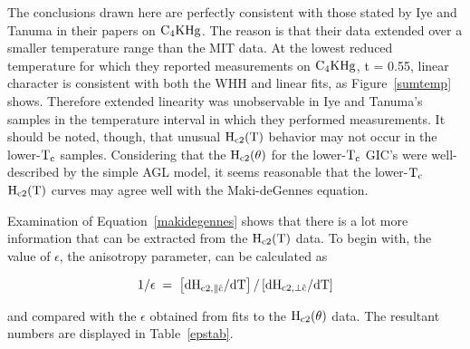         The conclusions  drawn  here are  perfectly consistent  with  those
stated by Iye and  Tanuma in their papers on  $\rm C_4KHg$.\cite{iye82} The
reason is  that their data extended  over a  smaller temperature range than
the MIT data.  At  the lowest  reduced temperature for which they  reported
measurements on $\rm C_4KHg$, t = 0.55, linear character is consistent with
both  the WHH and linear  fits, as   Figure~\ref{sumtemp} shows.  Therefore
extended linearity  was unobservable  in  Iye and  Tanuma's samples  in the
temperature interval in  which they performed measurements.  It  should  be
noted, though, that unusual $\rm H_{c2}(T)$  behavior may  not occur in the
lower-$\rm T_c$ samples.  Considering that the $\rm H_{c2}(\theta)$ for the
lower-$\rm T_c$ GIC's were well-described by the simple AGL model, it seems
reasonable that the lower-$\rm T_c$ $\rm H_{c2}(T)$ curves may agree well
with the Maki-deGennes equation.

        Examination of  Equation~\ref{makidegennes} shows  that  there is a
lot more information that can be extracted  from the $\rm  H_{c2}(T)$ data.
To   begin   with,  the      value   of   $\epsilon$,       the  anisotropy
parameter,\cite{morris72} can be calculated as

\[ \rm 1 / \epsilon \; = \; \left[ dH_{c2, \parallel \hat{c}}/dT \right] /
\left[ dH_{c2, \perp \hat{c}}/dT  \right]
\] 

\noindent and compared   with the   $\epsilon$ obtained   from    fits   to the  $\rm
H_{c2}(\theta)$     data.     The   resultant  numbers   are  displayed  in
Table~\ref{epstab}.

